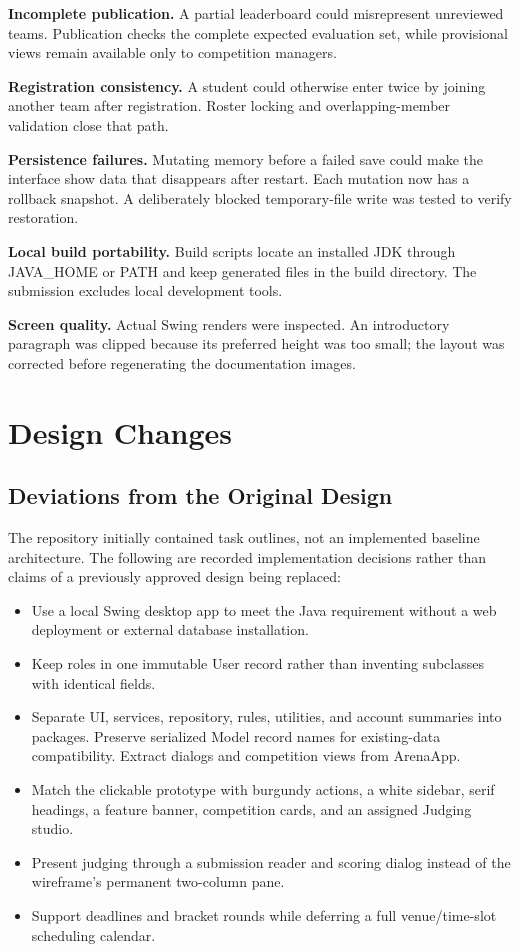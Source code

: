\documentclass[12pt]{article}
\begin{document}
\textbf{Incomplete publication.} A partial leaderboard could misrepresent unreviewed teams. Publication checks the complete expected evaluation set, while provisional views remain available only to competition managers.

\textbf{Registration consistency.} A student could otherwise enter twice by joining another team after registration. Roster locking and overlapping-member validation close that path.

\textbf{Persistence failures.} Mutating memory before a failed save could make the interface show data that disappears after restart. Each mutation now has a rollback snapshot. A deliberately blocked temporary-file write was tested to verify restoration.

\textbf{Local build portability.} Build scripts locate an installed JDK through JAVA\_HOME or PATH and keep generated files in the build directory. The submission excludes local development tools.

\textbf{Screen quality.} Actual Swing renders were inspected. An introductory paragraph was clipped because its preferred height was too small; the layout was corrected before regenerating the documentation images.

\section{Design Changes}
\subsection{Deviations from the Original Design}
The repository initially contained task outlines, not an implemented baseline architecture. The following are recorded implementation decisions rather than claims of a previously approved design being replaced:
\begin{itemize}
\item Use a local Swing desktop app to meet the Java requirement without a web deployment or external database installation.
\item Keep roles in one immutable User record rather than inventing subclasses with identical fields.
\item Separate UI, services, repository, rules, utilities, and account summaries into packages. Preserve serialized Model record names for existing-data compatibility. Extract dialogs and competition views from ArenaApp.
\item Match the clickable prototype with burgundy actions, a white sidebar, serif headings, a feature banner, competition cards, and an assigned Judging studio.
\item Present judging through a submission reader and scoring dialog instead of the wireframe's permanent two-column pane.
\item Support deadlines and bracket rounds while deferring a full venue/time-slot scheduling calendar.
\end{itemize}
\end{document}
